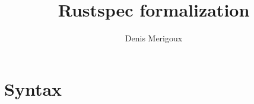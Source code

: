 \documentclass[11pt,a4paper]{article}
\title{Rustspec formalization}
\author{Denis Merigoux}
\begin{document}
\maketitle

\section{Syntax}

\newcommand{\synvar}[1]{\ensuremath{#1}}
\newcommand{\synkeyword}[1]{\textcolor{red!60!black}{\texttt{#1}}}
\newcommand{\synpunct}[1]{\textcolor{black!40!white}{\texttt{#1}}}

\newcommand{\synuse}{\synkeyword{use}\;}
\newcommand{\synconst}{\synkeyword{const}\;}
\newcommand{\syntypalias}{\synkeyword{type}\;}
\newcommand{\synfn}{\synkeyword{fn}\;}
\newcommand{\synbool}{\synkeyword{bool}}
\newcommand{\synint}{\synkeyword{int}}
\newcommand{\synseq}{\synkeyword{Seq}}
\newcommand{\synlet}{\synkeyword{let}\;}
\newcommand{\synmut}{\synkeyword{mut}}
\newcommand{\synif}{\synkeyword{if}\;}
\newcommand{\synthen}{\;\synkeyword{then}\;}
\newcommand{\synelse}{\;\synkeyword{else}\;}
\newcommand{\synfor}{\synkeyword{for}\;}
\newcommand{\synin}{\;\synkeyword{in}\;}
\newcommand{\syntrue}{\synkeyword{true}}
\newcommand{\synfalse}{\synkeyword{false}}

\newcommand{\synarraymacro}{\synkeyword{array!}}
\newcommand{\synpolymacro}{\synkeyword{poly!}}

\newcommand{\synsc}{\synpunct{;}}
\newcommand{\syntyped}{\;\synpunct{:}\;}
\newcommand{\syneq}{\;\synpunct{=}\;}
\newcommand{\synlparen}{\synpunct{(}\;}
\newcommand{\synrparen}{\;\synpunct{)}}
\newcommand{\syncomma}{\synpunct{,}\;}
\newcommand{\synref}{\synpunct{\&}}
\newcommand{\synlangle}{\synpunct{<}\;}
\newcommand{\synrangle}{\;\synpunct{>}}
\newcommand{\synlbracket}{\synpunct{\{}\;}
\newcommand{\synrbracket}{\;\synpunct{\}}}
\newcommand{\synarrow}{\;\synpunct{->}\;}
\newcommand{\synrange}{\;\synpunct{..}\;}
\newcommand{\synlsquare}{\synpunct{[}\;}
\newcommand{\synrsquare}{\;\synpunct{]}}

\newcommand{\syndef}{$::=$}
\newcommand{\synalt}{\;$|$\;}


\newcommand{\typctx}[1]{\textcolor{green!50!black}{\ensuremath{#1}}}

\newcommand{\typempty}{\typctx{\varnothing}}
\newcommand{\typtyped}{\;\typctx{:}\;}
\newcommand{\typsc}{\typctx{;}\;}
\newcommand{\typcomma}{\typctx{,}\;}
\newcommand{\typarrow}{\typctx{\;\rightarrow}\;}
\newcommand{\typlparen}{\typctx{(}\;}
\newcommand{\typrparen}{\;\typctx{)}}
\newcommand{\typlsquare}{\typctx{[}\;}
\newcommand{\typrsquare}{\;\typctx{]}}
\newcommand{\typlangle}{\typctx{<}\;}
\newcommand{\typrangle}{\;\typctx{>}}
\newcommand{\typeq}{\;\typctx{=}\;}
\newcommand{\typcomp}{\;\typctx{\circ}\;}
\newcommand{\typref}{\typctx{\&}}
\newcommand{\typellipsis}{\typctx{,\ldots,}\;}
\newcommand{\typderive}{\;\typctx{\vdash}\;}
\end{document}
